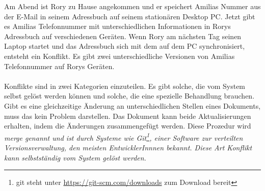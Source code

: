 Am Abend ist Rory zu Hause angekommen und er speichert Amilias Nummer aus der E-Mail in seinem Adressbuch auf seinem stationären Desktop PC.
Jetzt gibt es Amilias Telefonnummer mit unterschiedlichen Informationen in Rorys Adressbuch auf verschiedenen Geräten.
Wenn Rory am nächsten Tag seinen Laptop startet und das Adressbuch sich mit dem auf dem PC synchronisiert, entsteht ein Konflikt.
Es gibt zwei unterschiedliche Versionen von Amilias Telefonnummer auf Rorys Geräten.\\\\
%
%
Konflikte sind in zwei Kategorien einzuteilen. Es gibt solche, die vom System selbst gelöst werden können und solche, die eine spezielle Behandlung brauchen.
Gibt es eine gleichzeitige Änderung an unterschiedlichen Stellen eines Dokuments, muss das kein Problem darstellen.
Das Dokument kann beide Aktualisierungen erhalten, indem die Änderungen zusammengefügt werden.
Diese Prozedur wird \it{merge} genannt und ist durch Systeme wie Git\footnote{git steht unter \url{https://git-scm.com/downloads} zum Download bereit}, einer Software zur verteilten Versionsverwaltung, den meisten EntwicklerInnnen bekannt. Diese Art Konflikt kann selbstständig vom System gelöst werden.\\


